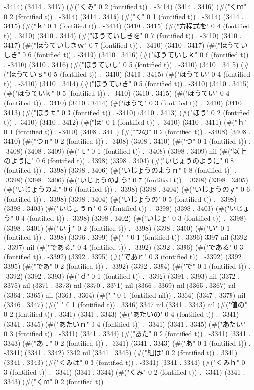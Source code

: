 -3414) (3414 . 3417) (#("くみ" 0 2 (fontified t)) . -3414) (3414 . 3416) (#("くｍ" 0 2 (fontified t)) . -3414) (3414 . 3416) (#("く" 0 1 (fontified t)) . -3414) (3414 . 3415) (#("ｋ" 0 1 (fontified t)) . -3414) (3410 . 3415) (#("方程式を" 0 4 (fontified t)) . 3410) (3410 . 3414) (#("ほうていしきを" 0 7 (fontified t)) . -3410) (3410 . 3417) (#("ほうていしきｗ" 0 7 (fontified t)) . -3410) (3410 . 3417) (#("ほうていしき" 0 6 (fontified t)) . -3410) (3410 . 3416) (#("ほうていしｋ" 0 6 (fontified t)) . -3410) (3410 . 3416) (#("ほうていし" 0 5 (fontified t)) . -3410) (3410 . 3415) (#("ほうていｓ" 0 5 (fontified t)) . -3410) (3410 . 3415) (#("ほうてい" 0 4 (fontified t)) . -3410) (3410 . 3414) (#("ほうていき" 0 5 (fontified t)) . -3410) (3410 . 3415) (#("ほうていｋ" 0 5 (fontified t)) . -3410) (3410 . 3415) (#("ほうてい" 0 4 (fontified t)) . -3410) (3410 . 3414) (#("ほうて" 0 3 (fontified t)) . -3410) (3410 . 3413) (#("ほうｔ" 0 3 (fontified t)) . -3410) (3410 . 3413) (#("ほう" 0 2 (fontified t)) . -3410) (3410 . 3412) (#("ほ" 0 1 (fontified t)) . -3410) (3410 . 3411) (#("ｈ" 0 1 (fontified t)) . -3410) (3408 . 3411) (#("つの" 0 2 (fontified t)) . -3408) (3408 . 3410) (#("つｎ" 0 2 (fontified t)) . -3408) (3408 . 3410) (#("つ" 0 1 (fontified t)) . -3408) (3408 . 3409) (#("ｔ" 0 1 (fontified t)) . -3408) (3398 . 3409) nil (#("以上のように" 0 6 (fontified t)) . 3398) (3398 . 3404) (#("いじょうのように" 0 8 (fontified t)) . -3398) (3398 . 3406) (#("いじょうのようｎ" 0 8 (fontified t)) . -3398) (3398 . 3406) (#("いじょうのよう" 0 7 (fontified t)) . -3398) (3398 . 3405) (#("いじょうのよ" 0 6 (fontified t)) . -3398) (3398 . 3404) (#("いじょうのｙ" 0 6 (fontified t)) . -3398) (3398 . 3404) (#("いじょうの" 0 5 (fontified t)) . -3398) (3398 . 3403) (#("いじょうｎ" 0 5 (fontified t)) . -3398) (3398 . 3403) (#("いじょう" 0 4 (fontified t)) . -3398) (3398 . 3402) (#("いじょ" 0 3 (fontified t)) . -3398) (3398 . 3401) (#("いｊ" 0 2 (fontified t)) . -3398) (3398 . 3400) (#("い" 0 1 (fontified t)) . -3398) (3396 . 3399) (#(" " 0 1 (fontified t)) . 3396) 3397 nil (3392 . 3397) nil (#("である." 0 4 (fontified t)) . -3392) (3392 . 3396) (#("である" 0 3 (fontified t)) . -3392) (3392 . 3395) (#("であｒ" 0 3 (fontified t)) . -3392) (3392 . 3395) (#("であ" 0 2 (fontified t)) . -3392) (3392 . 3394) (#("で" 0 1 (fontified t)) . -3392) (3392 . 3393) (#("ｄ" 0 1 (fontified t)) . -3392) (3391 . 3393) nil (3372 . 3375) nil (3371 . 3373) nil (3370 . 3371) nil (3366 . 3369) nil (3365 . 3367) nil (3364 . 3365) nil (3363 . 3364) (#(" " 0 1 (fontified nil)) . 3364) (3347 . 3379) nil (3346 . 3347) (#(" " 0 1 (fontified t)) . 3346) 3347 nil (3341 . 3343) nil (#("値の" 0 2 (fontified t)) . 3341) (3341 . 3343) (#("あたいの" 0 4 (fontified t)) . -3341) (3341 . 3345) (#("あたいｎ" 0 4 (fontified t)) . -3341) (3341 . 3345) (#("あたい" 0 3 (fontified t)) . -3341) (3341 . 3344) (#("あた" 0 2 (fontified t)) . -3341) (3341 . 3343) (#("あｔ" 0 2 (fontified t)) . -3341) (3341 . 3343) (#("あ" 0 1 (fontified t)) . -3341) (3341 . 3342) 3342 nil (3341 . 3345) (#("組は" 0 2 (fontified t)) . 3341) (3341 . 3343) (#("くみは" 0 3 (fontified t)) . -3341) (3341 . 3344) (#("くみｈ" 0 3 (fontified t)) . -3341) (3341 . 3344) (#("くみ" 0 2 (fontified t)) . -3341) (3341 . 3343) (#("くｍ" 0 2 (fontified t)) 